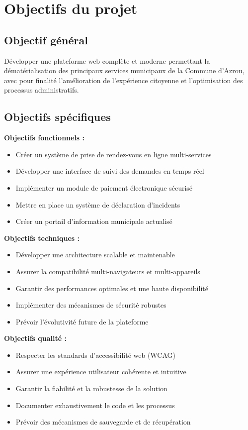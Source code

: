 \section{Objectifs du projet}

\subsection{Objectif général}

Développer une plateforme web complète et moderne permettant la dématérialisation des principaux services municipaux de la Commune d'Azrou, avec pour finalité l'amélioration de l'expérience citoyenne et l'optimisation des processus administratifs.

\subsection{Objectifs spécifiques}

\textbf{Objectifs fonctionnels :}
\begin{itemize}
\item Créer un système de prise de rendez-vous en ligne multi-services
\item Développer une interface de suivi des demandes en temps réel
\item Implémenter un module de paiement électronique sécurisé
\item Mettre en place un système de déclaration d'incidents
\item Créer un portail d'information municipale actualisé
\end{itemize}

\textbf{Objectifs techniques :}
\begin{itemize}
\item Développer une architecture scalable et maintenable
\item Assurer la compatibilité multi-navigateurs et multi-appareils
\item Garantir des performances optimales et une haute disponibilité
\item Implémenter des mécanismes de sécurité robustes
\item Prévoir l'évolutivité future de la plateforme
\end{itemize}

\textbf{Objectifs qualité :}
\begin{itemize}
\item Respecter les standards d'accessibilité web (WCAG)
\item Assurer une expérience utilisateur cohérente et intuitive
\item Garantir la fiabilité et la robustesse de la solution
\item Documenter exhaustivement le code et les processus
\item Prévoir des mécanismes de sauvegarde et de récupération
\end{itemize}

